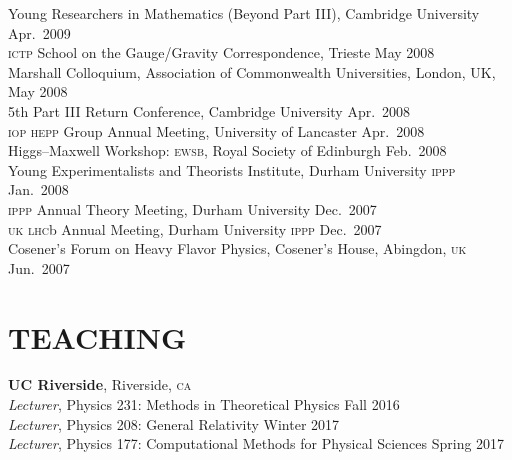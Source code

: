 \documentclass[margin,line]{resume}
\newcommand{\scap}[1]{\textsc{\MakeLowercase{#1}}}
\begin{document}
\begin{resume}
%
Young Researchers in Mathematics (Beyond Part III), Cambridge University
\hfill 
Apr.~2009\vspace{.7mm}\\
%
\scap{ICTP} School on the Gauge/Gravity Correspondence, Trieste
\hfill 
May 2008\vspace{.7mm}\\
%
Marshall Colloquium, Association of Commonwealth Universities, London, UK, \hfill May 2008\vspace{.7mm}\\
%
5th Part III Return Conference, Cambridge University
\hfill 
Apr.~2008\vspace{.7mm}\\
%
\scap{IOP HEPP} Group Annual Meeting, University of Lancaster
\hfill 
Apr.~2008\vspace{.7mm}\\
%
Higgs--Maxwell Workshop: \scap{EWSB}, Royal Society of Edinburgh
\hfill %
Feb.~2008\vspace{.7mm}\\
%
Young Experimentalists and Theorists Institute, Durham University \scap{IPPP}%
\hfill %
Jan.~2008\vspace{.7mm}\\
%
\scap{IPPP} Annual Theory Meeting, Durham University
\hfill%
Dec.~2007\vspace{.7mm}\\
%
\scap{UK LHC}b Annual Meeting, Durham University \scap{IPPP}
\hfill%
Dec.~2007\vspace{.7mm}\\	
%
Cosener's Forum on Heavy Flavor Physics, Cosener's House, Abingdon, \scap{UK}
\hfill%
Jun.~2007\vspace{.7mm}\\ 

\section{\footnotesize \sc
\sffamily 
{}
TEACHING
}

\textbf{UC Riverside}, Riverside, \scap{CA}
\\
\vspace{0mm}%
%
\textsl{Lecturer}, Physics 231: Methods in Theoretical Physics
\hfill {Fall 2016}\\
\vspace{0mm}%
%
\textsl{Lecturer}, Physics 208: General Relativity
\hfill {Winter 2017}\\
%
\textsl{Lecturer}, Physics 177: Computational Methods for Physical Sciences
\hfill {Spring 2017}%


\end{resume}
\end{document}
